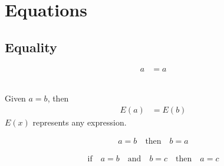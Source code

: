 %
%


\chapter{Equations}


\section{Equality}

\begin{property}
\begin{subequations}
\begin{align}
a &= a \label{eq:rpe} 
\end{align}
\end{subequations}
\end{property}

\begin{property} \hfill \\

Given $a=b$, then 
\begin{align}
E(a) &= E(b) \label{eq:spe} 
\end{align}
$E(x)$ represents any expression.
\end{property}

\begin{property}
\begin{subequations}
\begin{align}
a =b \quad \text{then} \quad b=a \label{eq:sype} 
\end{align}
\end{subequations}
\end{property}

\begin{property}
\begin{subequations}
\begin{align}
\text{if} \quad a =b \quad \text{and} \quad b=c \quad \text{then} \quad a =c \label{eq:tpe} 
\end{align}
\end{subequations}
\end{property}





